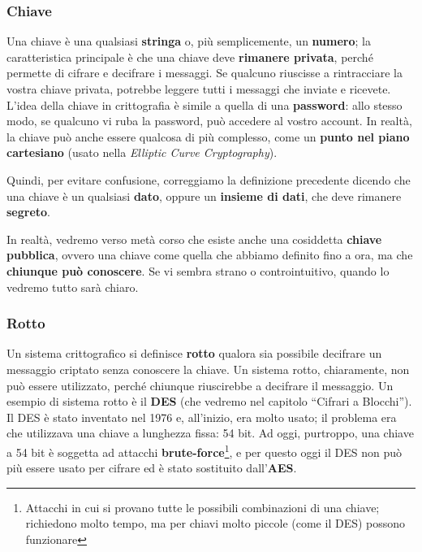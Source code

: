 \documentclass{report}
\begin{document}
\subsubsection{Chiave} 

Una chiave è una qualsiasi \textbf{stringa} o, più semplicemente, un \textbf{numero}; la caratteristica principale è che una chiave deve \textbf{rimanere privata}, perché permette di cifrare e decifrare i messaggi. Se qualcuno riuscisse a rintracciare la vostra chiave privata, potrebbe leggere tutti i messaggi che inviate e ricevete. L’idea della chiave in crittografia è simile a quella di una \textbf{password}: allo stesso modo, se qualcuno vi ruba la password, può accedere al vostro account. In realtà, la chiave può anche essere qualcosa di più complesso, come un \textbf{punto nel piano cartesiano} (usato nella \textit{Elliptic Curve Cryptography}).

Quindi, per evitare confusione, correggiamo la definizione precedente dicendo che una chiave è un qualsiasi \textbf{dato}, oppure un \textbf{insieme di dati}, che deve rimanere \textbf{segreto}.

In realtà, vedremo verso metà corso che esiste anche una cosiddetta \textbf{chiave pubblica}, ovvero una chiave come quella che abbiamo definito fino a ora, ma che \textbf{chiunque può conoscere}. Se vi sembra strano o controintuitivo, quando lo vedremo tutto sarà chiaro.

\newpage

\subsubsection{Rotto} 

Un sistema crittografico si definisce \textbf{rotto} qualora sia possibile decifrare un messaggio criptato senza conoscere la chiave. Un sistema rotto, chiaramente, non può essere utilizzato, perché chiunque riuscirebbe a decifrare il messaggio. Un esempio di sistema rotto è il \textbf{DES} (che vedremo nel capitolo “Cifrari a Blocchi”). Il DES è stato inventato nel 1976 e, all’inizio, era molto usato; il problema era che utilizzava una chiave a lunghezza fissa: 54 bit. Ad oggi, purtroppo, una chiave a 54 bit è soggetta ad attacchi \textbf{brute-force}\footnote{Attacchi in cui si provano tutte le possibili combinazioni di una chiave; richiedono molto tempo, ma per chiavi molto piccole (come il DES) possono funzionare}, e per questo oggi il DES non può più essere usato per cifrare ed è stato sostituito dall’\textbf{AES}.
\end{document}
